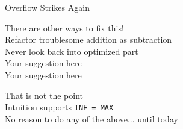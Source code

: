 \documentclass[usenames, xcolor=dvipsnames]{beamer}
\begin{document}
\begin{frame}{Overflow Strikes Again}

There are other ways to fix this!
\\ \pause \hspace{1em} \alert{Refactor} troublesome addition as subtraction
\\ \pause \hspace{1em} \alert{Never look back} into optimized part
\\ \pause \hspace{1em} Your suggestion here
\\ \pause \hspace{1em} Your suggestion here

\bigskip

\pause That is not the point
\\ \pause \hspace{1em} \alert{Intuition supports \texttt{INF = MAX}}
\\ \pause \hspace{1em} No reason to do any of the above\pause... until today

\end{frame}
\end{document}

